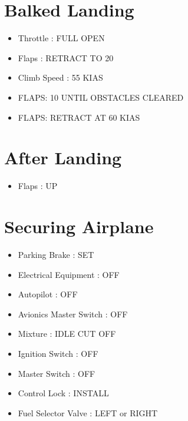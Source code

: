 \chapter{Balked Landing}
\label{balkedlanding}

\begin{itemize}
\item{} Throttle : FULL OPEN

\item{} Flaps : RETRACT TO 20

\item{} Climb Speed : 55 KIAS

\item{} FLAPS: 10 UNTIL OBSTACLES CLEARED

\item{} FLAPS: RETRACT AT 60 KIAS

\end{itemize}

\chapter{After Landing}
\label{afterlanding}

\begin{itemize}
\item{} Flaps : UP

\end{itemize}

\chapter{Securing Airplane}
\label{securingairplane}

\begin{itemize}
\item{} Parking Brake : SET

\item{} Electrical Equipment : OFF

\item{} Autopilot : OFF

\item{} Avionics Master Switch : OFF

\item{} Mixture : IDLE CUT OFF

\item{} Ignition Switch : OFF

\item{} Master Switch : OFF

\item{} Control Lock : INSTALL

\item{} Fuel Selector Valve : LEFT or RIGHT

\end{itemize}



